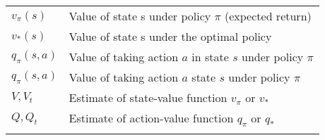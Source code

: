 \begin{longtable}{ll}
\\
$v_\pi(s)$ &  Value of state s under policy $\pi$ (expected return) \\
$v_*(s)$ &  Value of state s under the optimal policy  \\
$q_\pi(s,a)$ &  Value of taking action $a$ in state $s$ under policy $\pi$ \\
$q_\pi(s,a)$ &  Value of taking action $a$ state $s$ under policy $\pi$ \\
$V, V_t$     &  Estimate of state-value function $v_\pi$ or $v_*$\\
$Q, Q_t$     &  Estimate of action-value function $q_\pi$ or $q_*$\\
$ $     &  \\

\end{longtable}

